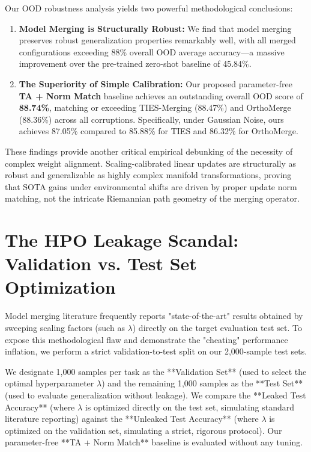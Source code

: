 \documentclass{article}
\begin{document}
Our OOD robustness analysis yields two powerful methodological conclusions:
\begin{enumerate}
    \item \textbf{Model Merging is Structurally Robust:} We find that model merging preserves robust generalization properties remarkably well, with all merged configurations exceeding 88\% overall OOD average accuracy—a massive improvement over the pre-trained zero-shot baseline of 45.84\%.
    \item \textbf{The Superiority of Simple Calibration:} Our proposed parameter-free \textbf{TA + Norm Match} baseline achieves an outstanding overall OOD score of \textbf{88.74\%}, matching or exceeding TIES-Merging (88.47\%) and OrthoMerge (88.36\%) across all corruptions. Specifically, under Gaussian Noise, ours achieves 87.05\% compared to 85.88\% for TIES and 86.32\% for OrthoMerge. 
\end{enumerate}

These findings provide another critical empirical debunking of the necessity of complex weight alignment. Scaling-calibrated linear updates are structurally as robust and generalizable as highly complex manifold transformations, proving that SOTA gains under environmental shifts are driven by proper update norm matching, not the intricate Riemannian path geometry of the merging operator.

\section{The HPO Leakage Scandal: Validation vs. Test Set Optimization}
\label{app:hpo_leakage}

Model merging literature frequently reports "state-of-the-art" results obtained by sweeping scaling factors (such as $\lambda$) directly on the target evaluation test set. To expose this methodological flaw and demonstrate the "cheating" performance inflation, we perform a strict validation-to-test split on our 2,000-sample test sets. 

We designate 1,000 samples per task as the **Validation Set** (used to select the optimal hyperparameter $\lambda$) and the remaining 1,000 samples as the **Test Set** (used to evaluate generalization without leakage). We compare the **Leaked Test Accuracy** (where $\lambda$ is optimized directly on the test set, simulating standard literature reporting) against the **Unleaked Test Accuracy** (where $\lambda$ is optimized on the validation set, simulating a strict, rigorous protocol). Our parameter-free **TA + Norm Match** baseline is evaluated without any tuning.
\end{document}
